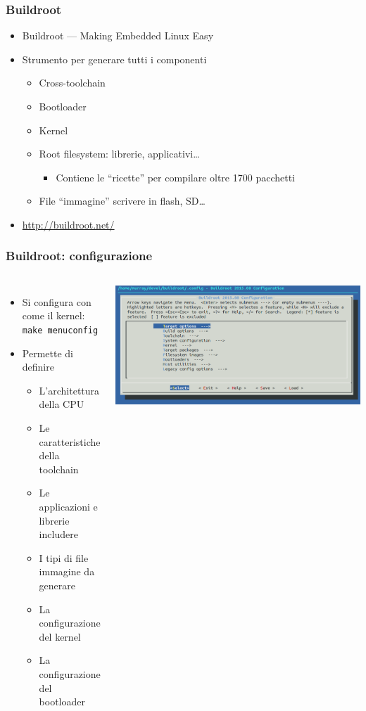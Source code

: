 \documentclass[xetex,table]{beamer}
\begin{document}
\begin{frame}
\frametitle{Buildroot}
  \begin{itemize}
  \item Buildroot --- Making Embedded Linux Easy
  \item Strumento per generare tutti i componenti
    \begin{itemize}
    \item Cross-toolchain
    \item Bootloader
    \item Kernel
    \item Root filesystem: librerie, applicativi\ldots
      \begin{itemize}
      \item Contiene le ``ricette'' per compilare oltre 1700 pacchetti
      \end{itemize}
    \item File ``immagine'' scrivere in flash, SD\ldots
    \end{itemize}
  \item \url{http://buildroot.net/}
  \end{itemize}
\end{frame}

\begin{frame}
  \frametitle{Buildroot: configurazione}
  \begin{columns}
    \begin{itemize}
    \item Si configura con  come il kernel:\\
      \texttt{make menuconfig}
    \item Permette di definire
      \begin{itemize}
      \item L'architettura della CPU
      \item Le caratteristiche della toolchain
      \item Le applicazioni e librerie includere
      \item I tipi di file immagine da generare
      \item La configurazione del kernel
      \item La configurazione del bootloader
      \end{itemize}
    \end{itemize}
    \includegraphics[width=\textwidth]{images/buildroot.png}
  \end{columns}
\end{frame}
\end{document}
